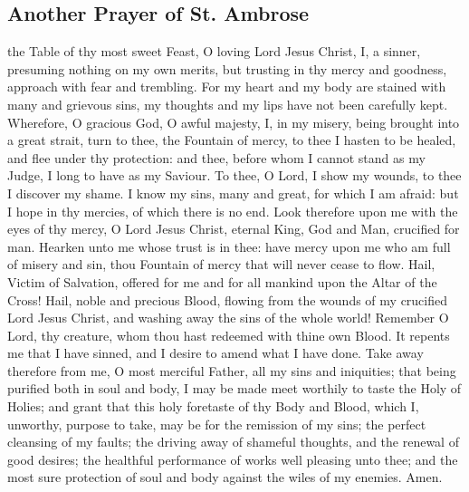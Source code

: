 \subsection{Another Prayer of St. Ambrose}
 the Table of thy most sweet Feast, O loving Lord Jesus Christ, I, a sinner, presuming nothing on my own merits, but trusting in thy mercy and goodness, approach with fear and trembling. For my heart and my body are stained with many and grievous sins, my thoughts and my lips have not been carefully kept. Wherefore, O gracious God, O awful majesty, I, in my misery, being brought into a great strait, turn to thee, the Fountain of mercy, to thee I hasten to be healed, and flee under thy protection: and thee, before whom I cannot stand as my Judge, I long to have as my Saviour. To thee, O Lord, I show my wounds, to thee I discover my shame. I know my sins, many and great, for which I am afraid: but I hope in thy mercies, of which there is no end. Look therefore upon me with the eyes of thy mercy, O Lord Jesus Christ, eternal King, God and Man, crucified for man. Hearken unto me whose trust is in thee: have mercy upon me who am full of misery and sin, thou Fountain of mercy that will never cease to flow. Hail, Victim of Salvation, offered for me and for all mankind upon the Altar of the Cross! Hail, noble and precious Blood, flowing from the wounds of my crucified Lord Jesus Christ, and washing away the sins of the whole world! Remember O Lord, thy creature, whom thou hast redeemed with thine own Blood. It repents me that I have sinned, and I desire to amend what I have done. Take away therefore from me, O most merciful Father, all my sins and iniquities; that being purified both in soul and body, I may be made meet worthily to taste the Holy of Holies; and grant that this holy foretaste of thy Body and Blood, which I, unworthy, purpose to take, may be for the remission of my sins; the perfect cleansing of my faults; the driving away of shameful thoughts, and the renewal of good desires; the healthful performance of works well pleasing unto thee; and the most sure protection of soul and body against the wiles of my enemies. Amen. 

